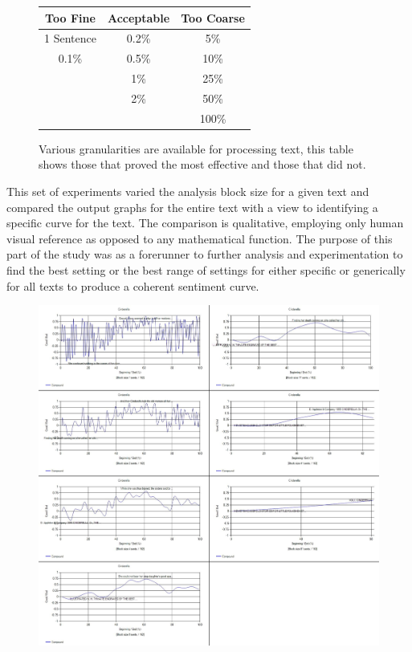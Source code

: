 \documentclass{article}
\begin{document}
{        \begin{figure}[hbtp]
            \begin{center}
                \begin{tabular}{ |c|c|c| } 
                \hline
                \textbf{Too Fine} & \textbf{Acceptable} & \textbf{Too Coarse} \\ 
                \hline
                1 Sentence & 0.2\% & 5\% \\ 
                0.1\% & 0.5\% & 10\% \\
                & 1\% & 25\% \\
                & 2\% & 50\% \\
                &  & 100\% \\
                \hline
                \end{tabular}
            \end{center}
            \centering
            \caption{Various granularities are available for processing text, this table shows those that proved the most effective and those that did not.}
            \label{fig:granChart}
        \end{figure}
        This set of experiments varied the analysis block size for a given text and compared the output graphs for the entire text with a view to identifying a specific curve for the text. The comparison is qualitative, employing only human visual reference as opposed to any mathematical function. The purpose of this part of the study was as a forerunner to further analysis and experimentation to find the best setting or the best range of settings for either specific or generically for all texts to produce a coherent sentiment curve.
        \begin{figure}
            \includegraphics[width=1\textwidth]{Figures/Blocksize/Cinderella/cinderellaGran}

\end{figure}}
\end{document}
